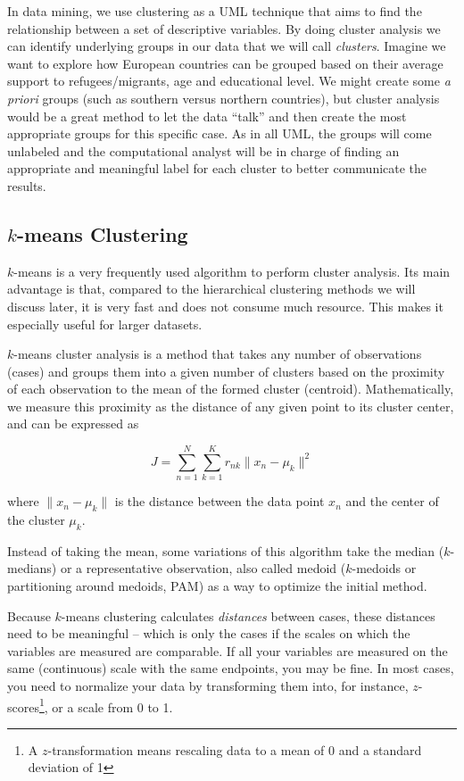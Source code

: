 In data mining, we use clustering as a UML technique that aims to find
the relationship between a set of descriptive variables. By doing
cluster analysis we can identify underlying groups in our data that we
will call \textit{clusters}. Imagine we want to explore how European
countries can be grouped based on their average support to
refugees/migrants, age and educational level. We might create some
\textit{a priori} groups (such as southern versus northern countries),
but cluster analysis would be a great method to let the data ``talk''
and then create the most appropriate groups for this specific case. As
in all UML, the groups will come unlabeled and the computational
analyst will be in charge of finding an appropriate and meaningful
label for each cluster to better communicate the results.

\subsection{$k$-means Clustering}

$k$-means is a very frequently used algorithm to perform cluster
analysis. Its main advantage is that, compared to the hierarchical
clustering methods we will discuss later, it is very fast and does not
consume much resource. This makes it especially useful for larger
datasets.

$k$-means cluster analysis is a method that takes any number of observations (cases) and groups them into a given number of clusters based on the proximity of each observation to the mean of the formed cluster (centroid).  Mathematically, we measure this proximity as the distance of any given point to its cluster center, and can be expressed as

$$J = \sum_{n=1}^{N} \sum_{k=1}^{K} r_{nk} \|x_n - \mu_k\|^2$$

where $\|x_n - \mu_k\|$ is the distance between the data point $x_n$ and the center of the cluster $\mu_k$.

Instead of taking the mean, some variations of this algorithm take the median ($k$-medians) or a representative observation, also called medoid ($k$-medoids or partitioning around medoids, PAM) as a way to optimize the initial method.

Because $k$-means clustering calculates \emph{distances} between cases,
these distances need to be meaningful -- which is only the cases if
the scales on which the variables are measured are comparable. If all
your variables are measured on the same (continuous) scale with the
same endpoints, you may be fine. In most cases, you need to normalize
your data by transforming them into, for instance, $z$-scores\footnote{A $z$-transformation means rescaling data to a mean of 0 and a standard deviation of 1}, or a
scale from 0 to 1.

